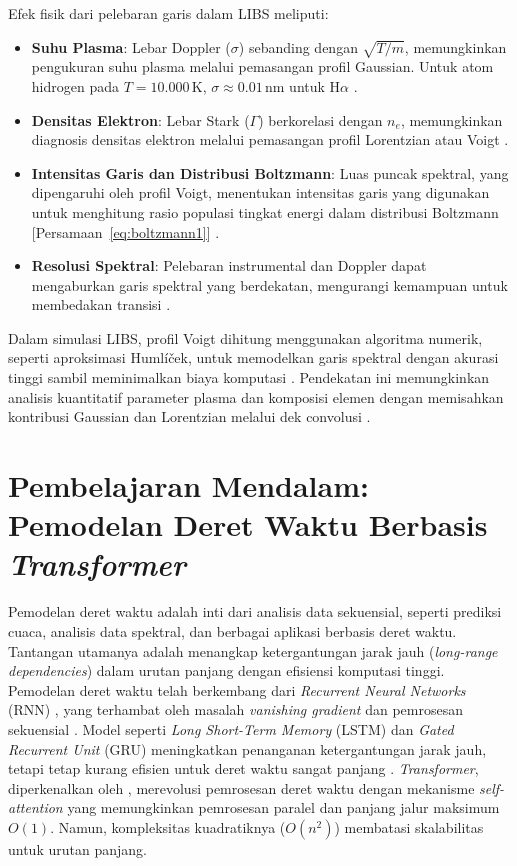 Efek fisik dari pelebaran garis dalam LIBS meliputi:
\begin{itemize}
  \item \textbf{Suhu Plasma}: Lebar Doppler (\( \sigma \)) sebanding dengan \( \sqrt{T/m} \), memungkinkan pengukuran suhu plasma melalui pemasangan profil Gaussian. Untuk atom hidrogen pada \( T = 10.000 \, \text{K} \), \( \sigma \approx 0.01 \, \text{nm} \) untuk H\(\alpha\) \citep{Demtroder2010}.
  \item \textbf{Densitas Elektron}: Lebar Stark (\( \Gamma \)) berkorelasi dengan \( n_e \), memungkinkan diagnosis densitas elektron melalui pemasangan profil Lorentzian atau Voigt \citep{Griem1997,Konjevic1999}.
  \item \textbf{Intensitas Garis dan Distribusi Boltzmann}: Luas puncak spektral, yang dipengaruhi oleh profil Voigt, menentukan intensitas garis yang digunakan untuk menghitung rasio populasi tingkat energi dalam distribusi Boltzmann [Persamaan~\eqref{eq:boltzmann1}] \citep{Miziolek2006}.
  \item \textbf{Resolusi Spektral}: Pelebaran instrumental dan Doppler dapat mengaburkan garis spektral yang berdekatan, mengurangi kemampuan untuk membedakan transisi \citep{Aragon2008}.
\end{itemize}

Dalam simulasi LIBS, profil Voigt dihitung menggunakan algoritma numerik, seperti aproksimasi Humlíček, untuk memodelkan garis spektral dengan akurasi tinggi sambil meminimalkan biaya komputasi \citep{Griem1997}. Pendekatan ini memungkinkan analisis kuantitatif parameter plasma dan komposisi elemen dengan memisahkan kontribusi Gaussian dan Lorentzian melalui dek convolusi \citep{Aragon2008}.

\section{Pembelajaran Mendalam: Pemodelan Deret Waktu Berbasis \textit{Transformer}}
\label{sec:transformer_informer}

Pemodelan deret waktu adalah inti dari analisis data sekuensial, seperti prediksi cuaca, analisis data spektral, dan berbagai aplikasi berbasis deret waktu. Tantangan utamanya adalah menangkap ketergantungan jarak jauh (\textit{long-range dependencies}) dalam urutan panjang dengan efisiensi komputasi tinggi. Pemodelan deret waktu telah berkembang dari \textit{Recurrent Neural Networks} (RNN) \citep{Bengio1994}, yang terhambat oleh masalah \textit{vanishing gradient} dan pemrosesan sekuensial \citep{Hochreiter1997}. Model seperti \textit{Long Short-Term Memory} (LSTM) dan \textit{Gated Recurrent Unit} (GRU) meningkatkan penanganan ketergantungan jarak jauh, tetapi tetap kurang efisien untuk deret waktu sangat panjang \citep{Hochreiter1997}. \textit{Transformer}, diperkenalkan oleh \citet{Vaswani2017}, merevolusi pemrosesan deret waktu dengan mekanisme \textit{self-attention} yang memungkinkan pemrosesan paralel dan panjang jalur maksimum \( O(1) \). Namun, kompleksitas kuadratiknya (\( O(n^2) \)) membatasi skalabilitas untuk urutan panjang.

